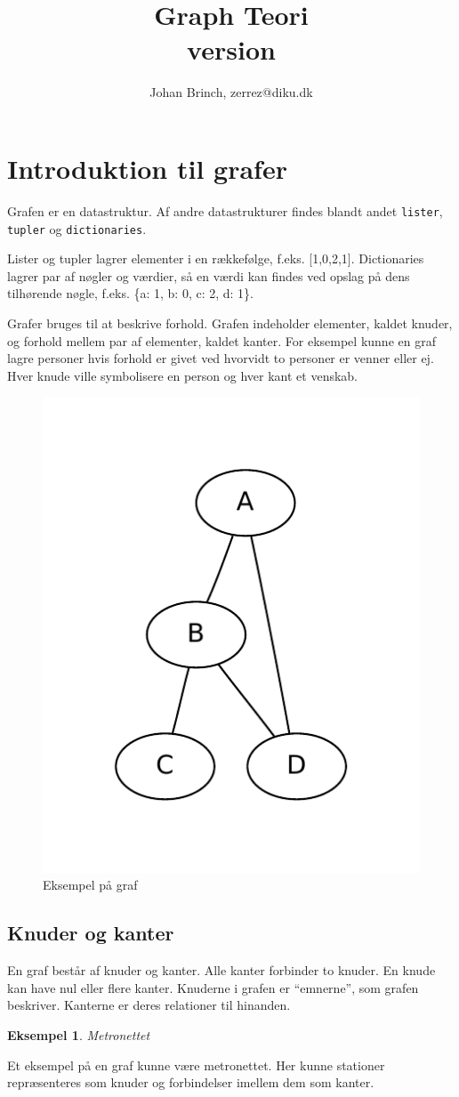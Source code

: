 \documentclass[10pt,a4paper,danish]{article}
\title{Graph Teori\\\small{version }}
\author{Johan Brinch, zerrez@diku.dk}
\newcommand{\ct}{\texttt}
\newtheorem{example}{Eksempel}[subsection]
\begin{document}
\maketitle
\newpage


\tableofcontents
\newpage

\section{Introduktion til grafer}
Grafen er en datastruktur. Af andre datastrukturer findes blandt andet
\ct{lister}, \ct{tupler} og \ct{dictionaries}.

Lister og tupler lagrer elementer i en rækkefølge,
f.eks. [1,0,2,1]. Dictionaries lagrer par af nøgler og værdier, så en
værdi kan findes ved opslag på dens tilhørende nøgle, f.eks. \{a: 1,
b: 0, c: 2, d: 1\}.

Grafer bruges til at beskrive forhold. Grafen indeholder elementer,
kaldet knuder, og forhold mellem par af elementer, kaldet kanter.  For
eksempel kunne en graf lagre personer hvis forhold er givet ved
hvorvidt to personer er venner eller ej. Hver knude ville symbolisere
en person og hver kant et venskab.


\begin{figure}[h]
\centering
\includegraphics[width=.3\textwidth]{graphs/graph0.pdf}
\caption{Eksempel på graf}
\label{fig:graph0}
\end{figure}


\subsection{Knuder og kanter}
En graf består af knuder og kanter. Alle kanter forbinder to
knuder. En knude kan have nul eller flere kanter. Knuderne i grafen er
"`emnerne"', som grafen beskriver. Kanterne er deres relationer til
hinanden.


\begin{example}Metronettet\end{example}
  Et eksempel på en graf kunne være metronettet. Her kunne stationer
  repræsenteres som knuder og forbindelser imellem dem som kanter.
\end{document}
